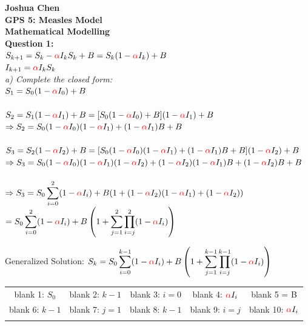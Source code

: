\documentclass[12pt]{article}
\begin{document}
\normalsize
{\bf Joshua Chen}\\
{\bf GPS 5: Measles Model}\\
{\bf Mathematical Modelling}\\

{\bf Question 1:}\\
$S_{k+1} = S_k - \textcolor{red} {\alpha} I_k S_k + B = S_k(1 - \textcolor{red} {\alpha} I_k) + B $\\
$I_{k+1} = \textcolor{red} {\alpha} I_k S_k$\\

\textit{a) Complete the closed form:}\\
\normalsize $S_1 = S_0(1 - \textcolor{red} {\alpha} I_0) + B$\\\\
$S_2 = S_1(1 - \textcolor{red} {\alpha} I_1) + B = [S_0(1 - \textcolor{red} {\alpha} I_0) + B](1 - \textcolor{red} {\alpha} I_1) + B$\\
$\Rightarrow S_2 = S_0(1 - \textcolor{red} {\alpha} I_0)(1 - \textcolor{red} {\alpha} I_1) + (1 - \textcolor{red} {\alpha} I_1)B + B$\\\\
$S_3 = S_2(1 - \textcolor{red} {\alpha} I_2) + B =  [S_0(1 - \textcolor{red} {\alpha} I_0)(1 - \textcolor{red} {\alpha} I_1) + (1 - \textcolor{red} {\alpha} I_1)B + B](1 - \textcolor{red} {\alpha} I_2) + B$\\
$\Rightarrow S_3 = S_0(1 - \textcolor{red} {\alpha} I_0)(1 - \textcolor{red} {\alpha} I_1)(1 - \textcolor{red} {\alpha} I_2) + (1 - \textcolor{red} {\alpha} I_2)(1 - \textcolor{red} {\alpha} I_1)B +(1 - \textcolor{red} {\alpha} I_2)B + B$\\\\
$\Rightarrow S_3 = S_0 \displaystyle\sum^{2}_{i=0}(1 - \textcolor{red} {\alpha} I_i) + B(1 + (1 -\textcolor{red} {\alpha} I_2)(1 - \textcolor{red} {\alpha} I_1) + (1 - \textcolor{red} {\alpha} I_2))$\\
\hphantom{sjssfa} $= S_0\displaystyle\sum^{2}_{i=0}(1 - \textcolor{red} {\alpha} I_i) + B\left(1 + \displaystyle\sum^{2}_{j=1} \displaystyle \prod^{2}_{i=j}(1 - \textcolor{red} {\alpha} I_{i})\right)$\\
\begin{center}
Generalized Solution:
$S_k = S_0 \displaystyle\sum^{k-1}_{i=0}(1 - \textcolor{red} {\alpha} I_i) + B\left(1 + \displaystyle\sum^{k-1}_{j=1}\displaystyle \prod^{k-1}_{i=j}(1 - \textcolor{red} {\alpha} I_{i})\right)$\\
\end{center}
\begin{center}
\begin{tabular}{ c c c c c} 
blank 1:  $S_0$ & blank 2: $k-1$ & blank 3: $i = 0$ & blank 4: $\textcolor{red} {\alpha} I_i$  & blank 5 = B\\ 
blank 6: $k-1$ & blank 7: $j = 1$ & blank 8: $k - 1$ & blank 9: $i = j$ &blank 10: $\textcolor{red} {\alpha} I_{i}$ \\\\
\end{tabular}
\end{center}
\end{document}

